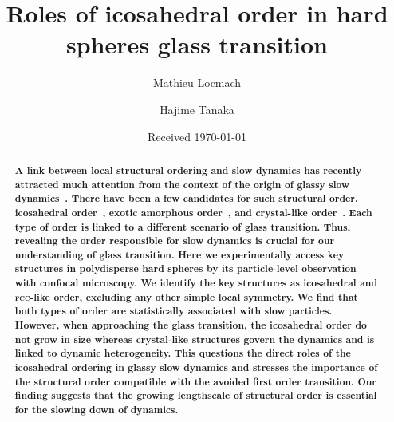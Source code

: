 


\title{Roles of icosahedral order in hard spheres glass transition} 


\author{Mathieu Locmach} 

\author{Hajime Tanaka}

\date{Received \today}

\begin{abstract}
{\bf
A link between local structural ordering and slow dynamics has recently attracted much attention from the context of the origin of glassy slow dynamics~\citep{cavagna2009supercooled,BerthierR}. There have been a few candidates for such structural order, icosahedral order~\cite{steinhardt1983boo,tarjus2005fba}, exotic amorphous order~\cite{xia2000flp}, and crystal-like order~\cite{tanaka2010critical}. Each type of order is linked to a different scenario of glass transition. Thus, revealing the order responsible for slow dynamics is crucial for our understanding of glass transition. Here we experimentally access key structures in polydisperse hard spheres by its particle-level observation with confocal microscopy. We identify the key structures as icosahedral and \textsc{fcc}-like order, excluding any other simple local symmetry. We find that both types of order are statistically associated with slow particles. However, when approaching the glass transition, the icosahedral order do not grow in size whereas crystal-like structures govern the dynamics and is linked to dynamic heterogeneity. This questions the direct roles of the icosahedral ordering in glassy slow dynamics and stresses the importance of the structural order compatible with the avoided first order transition. Our finding suggests that the growing lengthscale of structural order is essential for the slowing down of dynamics. 
}
\end{abstract}
\maketitle



